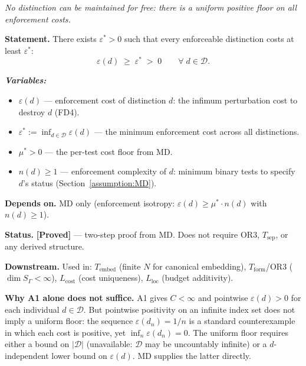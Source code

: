\documentclass[11pt]{article}
\theoremstyle{remark}
\newenvironment{varlist}{\begin{itemize}[nosep,leftmargin=2em]}{\end{itemize}}
\begin{document}
\begin{tcolorbox}[apfbox, title={$L_{\varepsilon^*}$ (Minimum Cost) --- Theorem}]
\label{sec:logical_status_eps_star}
\textit{No distinction can be maintained for free: there is a uniform positive floor on all enforcement costs.}

\smallskip\noindent\textbf{Statement.}  There exists $\varepsilon^* > 0$ such that every enforceable distinction costs at least $\varepsilon^*$:
\[
\varepsilon(d) \;\ge\; \varepsilon^* \;>\; 0 \qquad \forall\; d \in \mathcal{D}.
\]

\smallskip\noindent\textbf{\textit{Variables:}}
\begin{varlist}
\item $\varepsilon(d)$ --- enforcement cost of distinction $d$: the infimum perturbation cost to destroy $d$ (FD4).
\item $\varepsilon^* := \inf_{d \in \mathcal{D}} \varepsilon(d)$ --- the minimum enforcement cost across all distinctions.
\item $\mu^* > 0$ --- the per-test cost floor from MD.
\item $n(d) \ge 1$ --- enforcement complexity of $d$: minimum binary tests to specify $d$'s status (Section~\ref{assumption:MD}).
\end{varlist}

\smallskip\noindent\textbf{Depends on.}  MD only (enforcement isotropy: $\varepsilon(d) \ge \mu^* \cdot n(d)$ with $n(d) \ge 1$).

\smallskip\noindent\textbf{Status.}  \textbf{[Proved]} --- two-step proof from MD.  Does not require OR3, $T_{\mathrm{sep}}$, or any derived structure.

\smallskip\noindent\textbf{Downstream.}  Used in: $T_{\mathrm{embed}}$ (finite $N$ for canonical embedding), $T_{\mathrm{form}}$/OR3 ($\dim S_\Gamma < \infty$), $L_{\mathrm{cost}}$ (cost uniqueness), $L_{\mathrm{loc}}$ (budget additivity).

\smallskip\noindent\textbf{Why A1 alone does not suffice.}  A1 gives $C < \infty$ and pointwise $\varepsilon(d) > 0$ for each individual $d \in \mathcal{D}$.  But pointwise positivity on an infinite index set does not imply a uniform floor: the sequence $\varepsilon(d_n) = 1/n$ is a standard counterexample in which each cost is positive, yet $\inf_n \varepsilon(d_n) = 0$.  The uniform floor requires either a bound on $|\mathcal{D}|$ (unavailable: $\mathcal{D}$ may be uncountably infinite) or a $d$-independent lower bound on $\varepsilon(d)$.  MD supplies the latter directly.


\end{tcolorbox}
\end{document}
